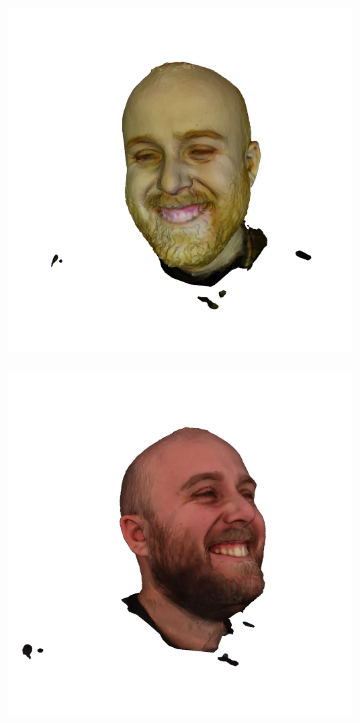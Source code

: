 \begin{figure}
\begin{subfigure}{0.18\linewidth}
        \includegraphics[width=\textwidth]{Figures/failed/stross/3d/snapshot11.png}
	\end{subfigure}
    \begin{subfigure}{0.18\linewidth}
        \includegraphics[width=\textwidth]{Figures/failed/stross/3d/snapshot14.png}

\end{subfigure}
\end{figure}
